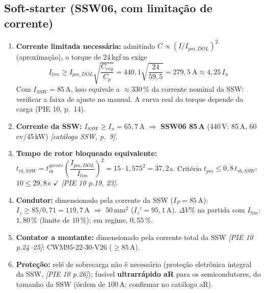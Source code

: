 \documentclass[11pt,a4paper]{article}
\newcommand{\src}[1]{\textit{[#1]}}
\begin{document}
\subsection{Soft-starter (SSW06, com limita\c{c}\~ao de corrente)}
\begin{enumerate}[leftmargin=1.4em]
\item \textbf{Corrente limitada necess\'aria:} admitindo $C\propto(I/I_{pm,DOL})^2$ (aproxima\c{c}\~ao), o torque de $24$\,kgf$\cdot$m exige
\[
I_{lim}\ge I_{pm,DOL}\sqrt{\dfrac{C_{req}}{C_p}}=440{,}1\sqrt{\dfrac{24}{59{,}5}}=279{,}5\ \text{A}\approx 4{,}25\,I_n
\]
Com $I_{SSW}=85$\,A, isso equivale a $\approx 330\,\%$ da corrente nominal da SSW: verificar a faixa de ajuste no manual. A curva real do torque depende da carga (PIE 10, p.~14).
\item \textbf{Corrente da SSW:} $I_{SSW}\ge I_n=65{,}7$\,A $\Rightarrow$ \textbf{SSW06 85\,A} (440\,V: 85\,A, 60\,cv/45\,kW) \src{cat\'alogo SSW, p.~9}.
\item \textbf{Tempo de rotor bloqueado equivalente:} $t_{rb,SSW}=t_{rb}^{quente}\left(\dfrac{I_{pm,DOL}}{I_{lim}}\right)^2=15\cdot 1{,}575^2=37{,}2$\,s. Crit\'erio $t_{pm}\le 0{,}8\,t_{rb,SSW}$: $10\le 29{,}8$\,s $\checkmark$ \src{PIE 10 p.19, 23}.
\item \textbf{Condutor:} dimensionado pela corrente da SSW ($I_P=85$\,A): $I_z\ge 85/0{,}71=119{,}7$\,A $\Rightarrow$ 50\,mm$^2$ ($I_z'=95{,}1$\,A). $\Delta V\%$ na partida com $I_{lim}$: $1{,}80\,\%$ (limite de $10\,\%$); em regime, $0{,}55\,\%$.
\item \textbf{Contator a montante:} dimensionado pela corrente total da SSW \src{PIE 10 p.24--25}: CWM95-22-30-V26 ($\ge 85$\,A).
\item \textbf{Prote\c{c}\~ao:} rel\'e de sobrecarga n\~ao \'e necess\'ario (prote\c{c}\~ao eletr\^onica integral da SSW, \src{PIE 10 p.26}); fus\'ivel \textbf{ultrarr\'apido aR} para os semicondutores, do tamanho da SSW (\'ordem de 100\,A; confirmar no cat\'alogo aR).
\end{enumerate}
\end{document}
